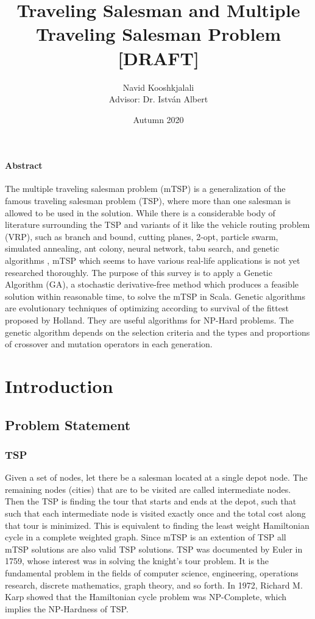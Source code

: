 \documentclass[11pt]{article}
\title{Traveling Salesman and Multiple Traveling Salesman Problem [DRAFT]}
\author{Navid Kooshkjalali\\{\small Advisor: Dr. István Albert}}
\date{Autumn 2020}
\begin{document}
\maketitle
\vspace*{2cm}
\paragraph{Abstract}
The multiple traveling salesman problem (mTSP) is a generalization of the famous traveling salesman problem (TSP), where more than one salesman is allowed to be used in the solution. While there is a considerable body of literature surrounding the TSP and variants of it like the vehicle routing problem (VRP), such as branch and bound\cite{branchnbound}, cutting planes\cite{cuttingplanes}, 2-opt\cite{twoopt}, particle swarm\cite{pswarm}, simulated annealing\cite{annealing}, ant colony\cite{ant1, ant2}, neural network\cite{nn}, tabu search\cite{tabu}, and genetic algorithms \cite{holland75, ga1, ga2, ga3}, mTSP which seems to have various real-life applications is not yet researched thoroughly. The purpose of this survey is to apply a Genetic Algorithm (GA), a stochastic derivative-free method which produces a feasible solution within reasonable time, to solve the mTSP in Scala. Genetic algorithms are evolutionary techniques of optimizing according to survival of the fittest proposed by Holland\cite{holland75}. They are useful algorithms for NP-Hard problems. The genetic algorithm depends on the selection criteria and the types and proportions of crossover and mutation operators in each generation.
\newpage
\section{Introduction}
\subsection{Problem Statement}

\subsubsection{TSP}
Given a set of nodes, let there be a salesman located at a single depot node. The remaining nodes (cities) that are to be visited are called intermediate nodes. Then the TSP is finding the tour that starts and ends at the depot, such that such that each intermediate node is visited exactly once and the total cost along that tour is minimized. This is equivalent to finding the least weight Hamiltonian cycle in a complete weighted graph. Since mTSP is an extention of TSP all mTSP solutions are also valid TSP solutions. TSP was documented by Euler in 1759, whose interest was in solving the knight's tour problem. It is the fundamental problem in the fields of computer science, engineering, operations research, discrete mathematics, graph theory, and so forth. In 1972, Richard M. Karp showed that the Hamiltonian cycle problem was NP-Complete\cite{karp72}, which implies the NP-Hardness of TSP.
\end{document}
